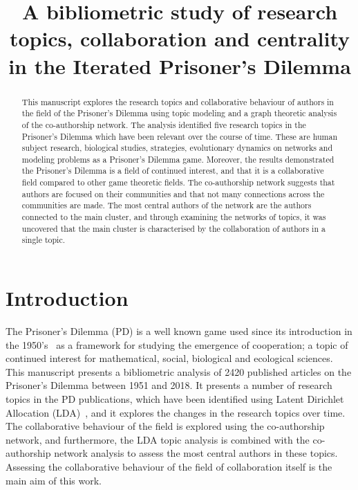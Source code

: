 \documentclass{article}
\title{A bibliometric study of research topics, collaboration and centrality 
       in the Iterated Prisoner's Dilemma}
\author{}
\theoremstyle{definition}
\begin{document}
\maketitle

\begin{abstract}
This manuscript explores the research topics and collaborative behaviour of
authors in the field of the Prisoner's Dilemma using topic modeling and a graph
theoretic analysis of the co-authorship network. The analysis identified five
research topics in the Prisoner's Dilemma which have been relevant over the course
of time. These are human subject research, biological studies, strategies,
evolutionary dynamics on networks and modeling problems as a Prisoner's Dilemma
game. Moreover, the results demonstrated the Prisoner's Dilemma is a field of
continued interest, and that it is a collaborative field compared to other
game theoretic fields. The co-authorship
network suggests that authors are focused on their communities and that not many
connections across the communities are made. The most central authors of the network
are the authors connected to the main cluster, and through examining the networks
of topics, it was uncovered that the main cluster is characterised by the
collaboration of authors in a single topic.
\end{abstract}


\section{Introduction}\label{section:introduction}

The Prisoner's Dilemma (PD) is a well known game used since its introduction in
the 1950's~\cite{Flood1958} as a framework for studying the emergence of
cooperation; a topic of continued interest for mathematical,
social, biological and
ecological sciences. This manuscript presents a bibliometric
analysis of 2420 published articles on the Prisoner's Dilemma between 1951 and
2018. It presents a number of research topics in the PD publications, which have been
identified using Latent Dirichlet Allocation (LDA)~\cite{Blei2003}, and it explores the changes in the
research topics over time. The collaborative behaviour of the field is explored
using the co-authorship network, and furthermore, the LDA
topic analysis is combined with the co-authorship network analysis to assess
the most central authors in these topics. Assessing the collaborative
behaviour of the field of collaboration itself is the main aim of this work.
\end{document}
